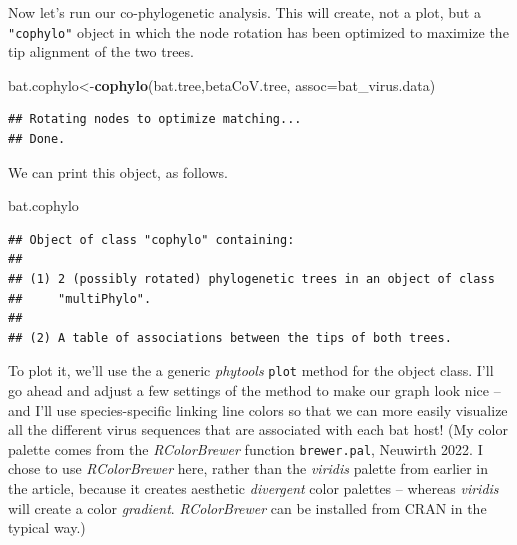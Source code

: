 \documentclass[fleqn,10pt,lineno]{wlpeerj} %
\newenvironment{Shaded}{\begin{snugshade}}{\end{snugshade}}
\newcommand{\AttributeTok}[1]{\textcolor[rgb]{0.13,0.29,0.53}{#1}}
\newcommand{\FunctionTok}[1]{\textcolor[rgb]{0.13,0.29,0.53}{\textbf{#1}}}
\newcommand{\NormalTok}[1]{#1}
\newcommand{\OtherTok}[1]{\textcolor[rgb]{0.56,0.35,0.01}{#1}}
\begin{document}
Now let's run our co-phylogenetic analysis. This will create, not a plot, but a \texttt{"cophylo"} object in which the node rotation has been optimized to maximize the tip alignment of the two trees.

\begin{Shaded}
\begin{Highlighting}[]
\NormalTok{bat.cophylo}\OtherTok{\textless{}{-}}\FunctionTok{cophylo}\NormalTok{(bat.tree,betaCoV.tree,}
  \AttributeTok{assoc=}\NormalTok{bat\_virus.data)}
\end{Highlighting}
\end{Shaded}

\begin{verbatim}
## Rotating nodes to optimize matching...
## Done.
\end{verbatim}

We can print this object, as follows.

\begin{Shaded}
\begin{Highlighting}[]
\NormalTok{bat.cophylo}
\end{Highlighting}
\end{Shaded}

\begin{verbatim}
## Object of class "cophylo" containing:
## 
## (1) 2 (possibly rotated) phylogenetic trees in an object of class 
##     "multiPhylo".
## 
## (2) A table of associations between the tips of both trees.
\end{verbatim}

To plot it, we'll use the a generic \emph{phytools} \texttt{plot} method for the object class. I'll go ahead and adjust a few settings of the method to make our graph look nice -- and I'll use species-specific linking line colors so that we can more easily visualize all the different virus sequences that are associated with each bat host! (My color palette comes from the \emph{RColorBrewer} function \texttt{brewer.pal}, Neuwirth 2022. I chose to use \emph{RColorBrewer} here, rather than the \emph{viridis} palette from earlier in the article, because it creates aesthetic \emph{divergent} color palettes -- whereas \emph{viridis} will create a color \emph{gradient}. \emph{RColorBrewer} can be installed from CRAN in the typical way.)
\end{document}
